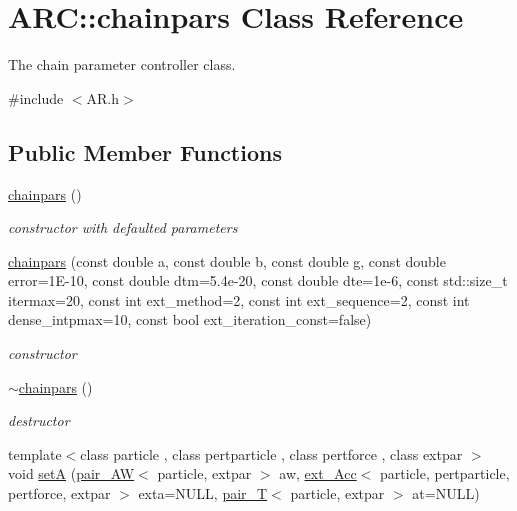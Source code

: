 \hypertarget{classARC_1_1chainpars}{}\section{A\+RC\+:\+:chainpars Class Reference}
\label{classARC_1_1chainpars}


The chain parameter controller class.  




{\ttfamily \#include $<$A\+R.\+h$>$}

\subsection*{Public Member Functions}
\begin{DoxyCompactItemize}
\item 
\hyperlink{classARC_1_1chainpars_a2019a609d85e2b801f306ac8c7f268ab}{chainpars} ()
\begin{DoxyCompactList}\small\item\em constructor with defaulted parameters \end{DoxyCompactList}\item 
\hyperlink{classARC_1_1chainpars_a26235d742aafa97dcaad75a5db74141e}{chainpars} (const double a, const double b, const double g, const double error=1\+E-\/10, const double dtm=5.\+4e-\/20, const double dte=1e-\/6, const std\+::size\+\_\+t itermax=20, const int ext\+\_\+method=2, const int ext\+\_\+sequence=2, const int dense\+\_\+intpmax=10, const bool ext\+\_\+iteration\+\_\+const=false)
\begin{DoxyCompactList}\small\item\em constructor \end{DoxyCompactList}\item 
\hyperlink{classARC_1_1chainpars_a032873f782645efb6e60dc77f6d425dc}{$\sim$chainpars} ()
\begin{DoxyCompactList}\small\item\em destructor \end{DoxyCompactList}\item 
{\footnotesize template$<$class particle , class pertparticle , class pertforce , class extpar $>$ }\\void \hyperlink{classARC_1_1chainpars_ad77ec5334198faaf5957ab6d02aa9b39}{setA} (\hyperlink{namespaceARC_a270b4c77765cacf073a5ef5f928f1d63}{pair\+\_\+\+AW}$<$ particle, extpar $>$ aw, \hyperlink{namespaceARC_a7aeda3b3bd009af7ac964748834dd312}{ext\+\_\+\+Acc}$<$ particle, pertparticle, pertforce, extpar $>$ exta=N\+U\+LL, \hyperlink{namespaceARC_aa489b85f285776ca334a82d85dc0381a}{pair\+\_\+T}$<$ particle, extpar $>$ at=N\+U\+LL)

\end{DoxyCompactItemize}
